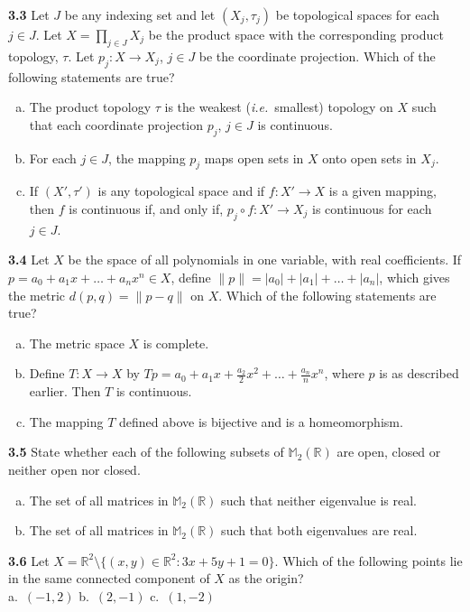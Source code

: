 \documentclass[11pt,a4paper]{article}
\newcommand{\R}{\mathbb{R}}
\newcommand{\M}{\mathbb{M}}
\newcommand{\qitem}[1]{\par\medskip\noindent\textbf{#1}\hspace{0.5em}}
\begin{document}
\qitem{3.3} Let $J$ be any indexing set and let $(X_j, \tau_j)$ be topological spaces for each $j \in J$. Let $X = \prod_{j \in J} X_j$ be the product space with the corresponding product topology, $\tau$. Let $p_j : X \to X_j$, $j \in J$ be the coordinate projection. Which of the following statements are true?
\begin{enumerate}[a.]
  \item The product topology $\tau$ is the weakest (\emph{i.e.}\ smallest) topology on $X$ such that each coordinate projection $p_j$, $j \in J$ is continuous.
  \item For each $j \in J$, the mapping $p_j$ maps open sets in $X$ onto open sets in $X_j$.
  \item If $(X', \tau')$ is any topological space and if $f : X' \to X$ is a given mapping, then $f$ is continuous if, and only if, $p_j \circ f : X' \to X_j$ is continuous for each $j \in J$.
\end{enumerate}

\qitem{3.4} Let $X$ be the space of all polynomials in one variable, with real coefficients. If $p = a_0 + a_1 x + \dots + a_n x^n \in X$, define $\|p\| = |a_0| + |a_1| + \dots + |a_n|$, which gives the metric $d(p, q) = \|p - q\|$ on $X$. Which of the following statements are true?
\begin{enumerate}[a.]
  \item The metric space $X$ is complete.
  \item Define $T : X \to X$ by $Tp = a_0 + a_1 x + \frac{a_2}{2}x^2 + \dots + \frac{a_n}{n}x^n$, where $p$ is as described earlier. Then $T$ is continuous.
  \item The mapping $T$ defined above is bijective and is a homeomorphism.
\end{enumerate}

\qitem{3.5} State whether each of the following subsets of $\M_2(\R)$ are open, closed or neither open nor closed.
\begin{enumerate}[a.]
  \item The set of all matrices in $\M_2(\R)$ such that neither eigenvalue is real.
  \item The set of all matrices in $\M_2(\R)$ such that both eigenvalues are real.
\end{enumerate}

\qitem{3.6} Let $X = \R^2 \setminus \{(x, y) \in \R^2 : 3x + 5y + 1 = 0\}$. Which of the following points lie in the same connected component of $X$ as the origin?\\
a.\ $(-1, 2)$ \qquad b.\ $(2, -1)$ \qquad c.\ $(1, -2)$
\end{document}
